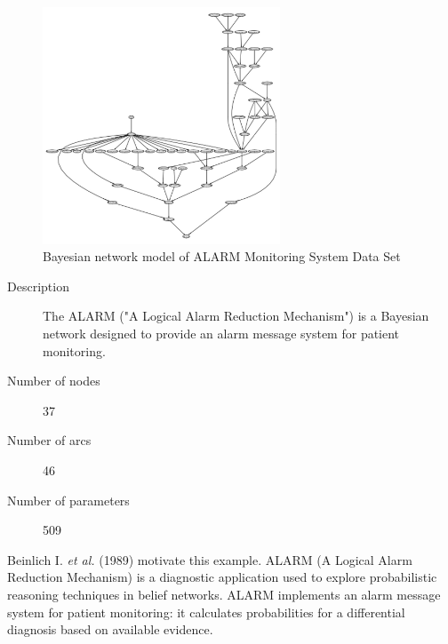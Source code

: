 	\begin{figure}[h]
	\centering
		\includegraphics[height=200pt]{Real_Alarm}
		\caption{Bayesian network model of ALARM Monitoring System Data Set}
	\end{figure}	

\begin{description}
	\item[Description] The ALARM ("A Logical Alarm Reduction Mechanism") is a Bayesian network designed to provide an alarm message system for patient monitoring.

	\item[Number of nodes] 37
	
	\item[Number of arcs] 46
	
	\item[Number of parameters] 509
\end{description}

Beinlich I. \emph{et al.} (1989) motivate this example. ALARM (A Logical Alarm Reduction Mechanism) is a diagnostic application used to explore probabilistic reasoning techniques in belief networks. ALARM implements an alarm message system for patient monitoring: it calculates probabilities for a differential diagnosis based on available evidence.

